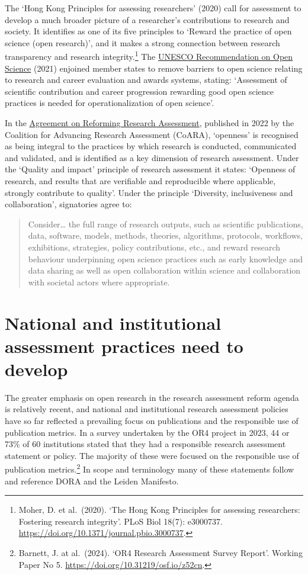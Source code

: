\documentclass[
  letterpaper,
  DIV=11,
  numbers=noendperiod,
  oneside]{scrreprt}
\begin{document}
The `Hong Kong Principles for assessing researchers' (2020) call for
assessment to develop a much broader picture of a researcher's
contributions to research and society. It identifies as one of its five
principles to `Reward the practice of open science (open research)', and
it makes a strong connection between research transparency and research
integrity.\footnote{Moher, D. et al.~(2020). `The Hong Kong Principles
  for assessing researchers: Fostering research integrity'. PLoS Biol
  18(7): e3000737. \url{https://doi.org/10.1371/journal.pbio.3000737}.}
The \href{https://doi.org/10.54677/MNMH8546}{UNESCO Recommendation on
Open Science} (2021) enjoined member states to remove barriers to open
science relating to research and career evaluation and awards systems,
stating: `Assessment of scientific contribution and career progression
rewarding good open science practices is needed for operationalization
of open science'.

In the
\href{https://coara.eu/agreement/the-agreement-full-text/}{Agreement on
Reforming Research Assessment}, published in 2022 by the Coalition for
Advancing Research Assessment (CoARA), `openness' is recognised as being
integral to the practices by which research is conducted, communicated
and validated, and is identified as a key dimension of research
assessment. Under the `Quality and impact' principle of research
assessment it states: `Openness of research, and results that are
verifiable and reproducible where applicable, strongly contribute to
quality'. Under the principle `Diversity, inclusiveness and
collaboration', signatories agree to:

\begin{quote}
Consider\ldots{} the full range of research outputs, such as scientific
publications, data, software, models, methods, theories, algorithms,
protocols, workflows, exhibitions, strategies, policy contributions,
etc., and reward research behaviour underpinning open science practices
such as early knowledge and data sharing as well as open collaboration
within science and collaboration with societal actors where appropriate.
\end{quote}

\section{National and institutional assessment practices need to
develop}\label{national-and-institutional-assessment-practices-need-to-develop}

The greater emphasis on open research in the research assessment reform
agenda is relatively recent, and national and institutional research
assessment policies have so far reflected a prevailing focus on
publications and the responsible use of publication metrics. In a survey
undertaken by the OR4 project in 2023, 44 or 73\% of 60 institutions
stated that they had a responsible research assessment statement or
policy. The majority of these were focused on the responsible use of
publication metrics.\footnote{Barnett, J. at al.~(2024). `OR4 Research
  Assessment Survey Report'. Working Paper No 5.
  \url{https://doi.org/10.31219/osf.io/z52cn}.} In scope and terminology
many of these statements follow and reference DORA and the Leiden
Manifesto.
\end{document}
